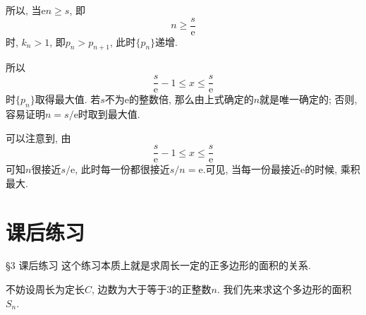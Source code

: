 \documentclass[serif]{beamer}
\begin{document}
\begin{frame}
	所以, 当$\mathrm{e}n\ge s$, 即
	\[n\ge\frac{s}{\mathrm{e}}\]
	时, $k_n>1$, 即$p_n>p_{n+1}$, 此时$\{p_n\}$递增.\par
	所以
	\[\frac{s}{\mathrm{e}}-1\le x\le\frac{s}{\mathrm{e}}\]
	时$\{p_n\}$取得最大值. 若$s$不为$\mathrm{e}$的整数倍, 那么由上式确定的$n$就是唯一确定的; 否则, 容易证明$n=s/\mathrm{e}$时取到最大值.\par
	
\end{frame}

\begin{frame}
	可以注意到, 由
	\[\frac{s}{\mathrm{e}}-1\le x\le\frac{s}{\mathrm{e}}\]
	可知$n$很接近$s/\mathrm{e}$, 此时每一份都很接近$s/n=\mathrm{e}$.可见, 当每一份最接近$\mathrm{e}$的时候, 乘积最大.
\end{frame}

\section{\heiti 课后练习}

\begin{frame}{\S3 课后练习}
	这个练习本质上就是求周长一定的正多边形的面积的关系. \par
	不妨设周长为定长$C$, 边数为大于等于$3$的正整数$n$. 我们先来求这个多边形的面积$S_n$.
\end{frame}
\end{document}
